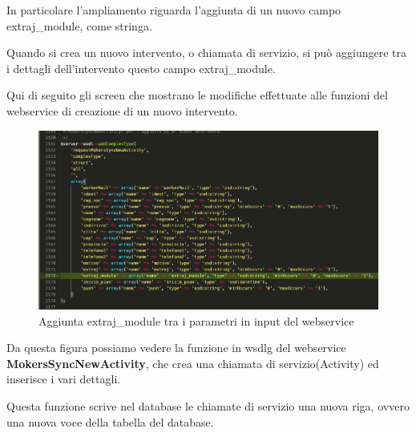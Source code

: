 \begin{flushleft}
	In particolare l'ampliamento riguarda l'aggiunta di un nuovo campo extraj\_module, come  stringa.
	
	Quando si crea un nuovo intervento, o chiamata di servizio, si può aggiungere tra i dettagli dell'intervento questo campo extraj\_module.
	
	Qui di seguito gli screen che mostrano le modifiche effettuate alle funzioni del webservice di creazione di un nuovo intervento.
\end{flushleft}
\newspace
\begin{figure}[!h] 
	\centering
	\includegraphics[scale = 0.4]{immagini/webservices/ampliamenti/2ampl_prototipo_types.png}
	\caption{Aggiunta extraj\_module tra i parametri in input del webservice}
\end{figure}
\newspace
\begin{flushleft}
	Da questa figura possiamo vedere la funzione in \gls{wsdlg} del webservice \textbf{MokersSyncNewActivity}, che crea una chiamata di servizio(Activity) ed inserisce i vari dettagli. 
	
	Questa funzione scrive nel database le chiamate di servizio una nuova riga, ovvero una nuova voce della tabella del database.
\end{flushleft}

\newpage


